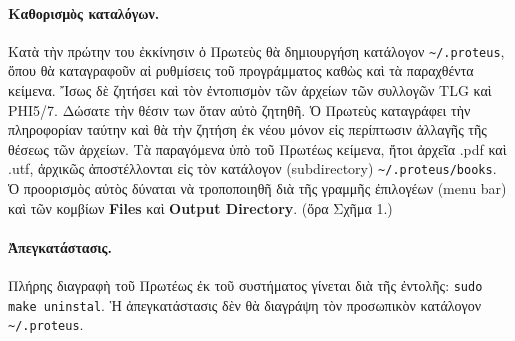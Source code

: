 \documentclass[12pt,a4paper]{article}
\begin{document}
    \paragraph{Καθορισμὸς καταλόγων.}
      Κατὰ τὴν πρώτην του ἐκκίνησιν ὁ Πρωτεὺς θὰ δημιουργήση κατάλογον
      {\tt \~{}/.proteus}, ὅπου θὰ καταγραφοῦν αἱ ρυθμίσεις τοῦ προγράμματος
      καθὼς καὶ τὰ παραχθέντα κείμενα. Ἴσως δὲ ζητήσει καὶ τὸν ἐντοπισμὸν τῶν
      ἀρχείων τῶν συλλογῶν TLG καὶ PHI5/7.
      Δώσατε τὴν θέσιν των ὅταν αὐτὸ ζητηθῆ.  Ὁ Πρωτεὺς καταγράφει τὴν πληροφορίαν
      ταύτην καὶ θὰ τὴν ζητήση ἐκ νέου μόνον εἰς περίπτωσιν
      ἀλλαγῆς τῆς θέσεως τῶν ἀρχείων.  Τὰ παραγόμενα ὑπὸ τοῦ Πρωτέως κείμενα, ἤτοι
      ἀρχεῖα .pdf καὶ .utf, ἀρχικῶς ἀποστέλλονται εἰς τὸν κατάλογον (subdirectory)
      {\tt \~{}/.proteus/books}. Ὁ προορισμὸς αὐτὸς δύναται νὰ τροποποιηθῆ
      διὰ τῆς γραμμῆς ἐπιλογέων (menu bar) καὶ τῶν κομβίων
      {\bf Files} καὶ {\bf Output Directory}. (ὅρα Σχῆμα 1.)
    \paragraph{Ἀπεγκατάστασις.}
      Πλήρης διαγραφὴ τοῦ Πρωτέως ἐκ τοῦ συστήματος γίνεται διὰ τῆς ἐντολῆς:
      {\tt sudo make uninstal}.  Ἡ ἀπεγκατάστασις δὲν θὰ
      διαγράψη τὸν προσωπικὸν κατάλογον {\tt \~{}/.proteus}.
\end{document}
